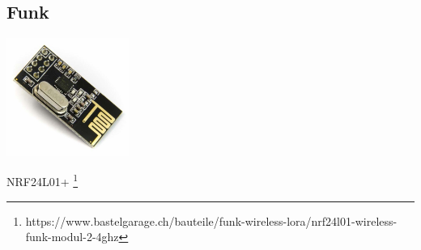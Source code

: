 \documentclass[
  12pt, %
  a4paper, %
  twoside, %
  openany, %
  numbers=noenddot, %
  BCOR=5mm, %
  parskip=half*, %
  thesis, %
]{bfhbook}
\newcommand{\compImgSize}{4cm}
\begin{document}
\subsection{Funk}
\begin{flushleft}
        \includegraphics[width=\compImgSize]{Bilder/NRF24.jpg} %
        \captionsetup{justification=raggedright}
\end{flushleft}
NRF24L01+ \footnote{https://www.bastelgarage.ch/bauteile/funk-wireless-lora/nrf24l01-wireless-funk-modul-2-4ghz}
\listoffigures
\listoftables
\printglossary
\end{document}
